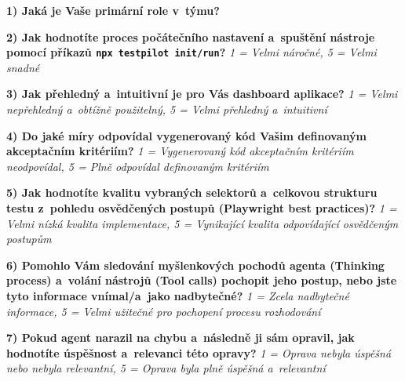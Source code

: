 \documentclass[czech, ing, kiv, he, iso690numb, viewonly]{fasthesis}
\begin{document}
\begin{tcolorbox}[breakable, colback=gray!3, colframe=black!35, boxrule=0.4pt, arc=2pt, title={Google Forms - export odpovědi}]

\textbf{1) Jaká je Vaše primární role v~týmu?}

 \quad {} \quad {} 

\quad {} \quad {}

\textbf{2) Jak hodnotíte proces počátečního nastavení a~spuštění nástroje pomocí příkazů \texttt{npx testpilot init/run}?}
\textit{1 = Velmi náročné, 5 = Velmi snadné}

 \quad {} \quad {} \quad {} \quad {}

\textbf{3) Jak přehledný a~intuitivní je pro Vás dashboard aplikace?}
\textit{1 = Velmi nepřehledný a~obtížně použitelný, 5 = Velmi přehledný a~intuitivní}

 \quad {} \quad {} \quad {} \quad {}

\textbf{4) Do jaké míry odpovídal vygenerovaný kód Vašim definovaným akceptačním kritériím?}
\textit{1 = Vygenerovaný kód akceptačním kritériím neodpovídal, 5 = Plně odpovídal definovaným kritériím}

 \quad {} \quad {} \quad {} \quad {}

\textbf{5) Jak hodnotíte kvalitu vybraných selektorů a~celkovou strukturu testu z~pohledu osvědčených postupů (Playwright best practices)?}
\textit{1 = Velmi nízká kvalita implementace, 5 = Vynikající kvalita odpovídající osvědčeným postupům}

 \quad {} \quad {} \quad {} \quad {}

\textbf{6) Pomohlo Vám sledování myšlenkových pochodů agenta (Thinking process) a~volání nástrojů (Tool calls) pochopit jeho postup, nebo jste tyto informace vnímal/a~jako nadbytečné?}
\textit{1 = Zcela nadbytečné informace, 5 = Velmi užitečné pro pochopení procesu rozhodování}

 \quad {} \quad {} \quad {} \quad {}

\textbf{7) Pokud agent narazil na chybu a~následně ji sám opravil, jak hodnotíte úspěšnost a~relevanci této opravy?}
\textit{1 = Oprava nebyla úspěšná nebo nebyla relevantní, 5 = Oprava byla plně úspěšná a~relevantní}


\end{tcolorbox}
\end{document}
